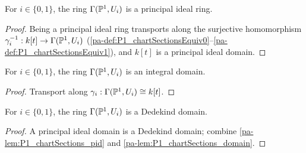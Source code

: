 \begin{lemma}
  \label{pa-lem:P1_chartSections_pid}
  \leanok

  For \(i \in \{0,1\}\), the ring \(\Gamma(\mathbb{P}^1, U_i)\) is a principal ideal ring.
\end{lemma}
\begin{proof}
  \leanok
  Being a principal ideal ring transports along the surjective homomorphism
  \(\gamma_i^{-1} : k[t] \to \Gamma(\mathbb{P}^1, U_i)\)
  (\ref{pa-def:P1_chartSectionsEquiv0}--\ref{pa-def:P1_chartSectionsEquiv1}), and \(k[t]\) is a
  principal ideal domain.
\end{proof}

\begin{lemma}
  \label{pa-lem:P1_chartSections_domain}
  \leanok

  For \(i \in \{0,1\}\), the ring \(\Gamma(\mathbb{P}^1, U_i)\) is an integral domain.
\end{lemma}
\begin{proof}
  \leanok
  Transport along \(\gamma_i : \Gamma(\mathbb{P}^1, U_i) \cong k[t]\).
\end{proof}

\begin{theorem}
  \label{pa-thm:P1_chartSections_dedekind}
  \leanok

  For \(i \in \{0,1\}\), the ring \(\Gamma(\mathbb{P}^1, U_i)\) is a Dedekind domain.
\end{theorem}
\begin{proof}
  \leanok
  A principal ideal domain is a Dedekind domain; combine
  \ref{pa-lem:P1_chartSections_pid} and \ref{pa-lem:P1_chartSections_domain}.
\end{proof}

